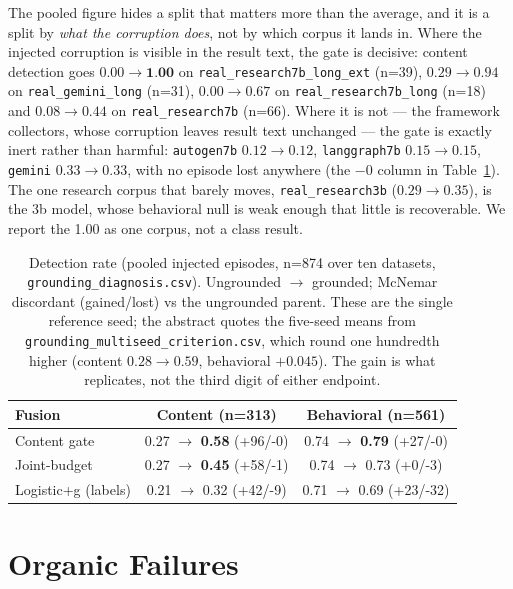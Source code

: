 \documentclass{article}
\begin{document}
The pooled figure hides a split that matters more than the average, and it is a split by \emph{what the corruption does}, not by which corpus it lands in. Where the injected corruption is visible in the result text, the gate is decisive: content detection goes $0.00 \rightarrow \textbf{1.00}$ on \texttt{real\_research7b\_long\_ext} (n=39), $0.29 \rightarrow 0.94$ on \texttt{real\_gemini\_long} (n=31), $0.00 \rightarrow 0.67$ on \texttt{real\_research7b\_long} (n=18) and $0.08 \rightarrow 0.44$ on \texttt{real\_research7b} (n=66). Where it is not --- the framework collectors, whose corruption leaves result text unchanged --- the gate is exactly inert rather than harmful: \texttt{autogen7b} $0.12 \rightarrow 0.12$, \texttt{langgraph7b} $0.15 \rightarrow 0.15$, \texttt{gemini} $0.33 \rightarrow 0.33$, with no episode lost anywhere (the $-0$ column in Table~\ref{tab:grounding}). The one research corpus that barely moves, \texttt{real\_research3b} ($0.29 \rightarrow 0.35$), is the 3b model, whose behavioral null is weak enough that little is recoverable. We report the 1.00 as one corpus, not a class result.

\begin{table}[tbp]
\centering
\caption{Detection rate (pooled injected episodes, n=874 over ten datasets,
\texttt{grounding\_diagnosis.csv}). Ungrounded $\rightarrow$ grounded; McNemar
discordant (gained/lost) vs the ungrounded parent. These are the single
reference seed; the abstract quotes the five-seed means from
\texttt{grounding\_multiseed\_criterion.csv}, which round one hundredth higher
(content $0.28 \rightarrow 0.59$, behavioral $+0.045$). The gain is what
replicates, not the third digit of either endpoint.}
\label{tab:grounding}
\begin{tabular}{lcc}
\toprule
Fusion & Content (n=313) & Behavioral (n=561) \\
\midrule
Content gate & 0.27 $\rightarrow$ \textbf{0.58} (+96/-0) & 0.74 $\rightarrow$ \textbf{0.79} (+27/-0) \\
Joint-budget & 0.27 $\rightarrow$ \textbf{0.45} (+58/-1) & 0.74 $\rightarrow$ 0.73 (+0/-3) \\
Logistic+g (labels) & 0.21 $\rightarrow$ 0.32 (+42/-9) & 0.71 $\rightarrow$ 0.69 (+23/-32) \\
\bottomrule
\end{tabular}
\end{table}

\section{Organic Failures}
\label{sec:organic}
\end{document}
